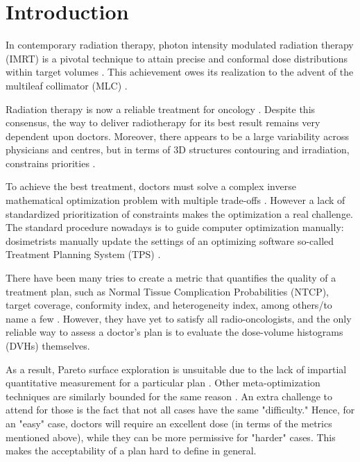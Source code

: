 \section{Introduction}
In contemporary radiation therapy, photon intensity modulated radiation therapy (IMRT) is a pivotal technique to attain precise and conformal dose distributions within target volumes \cite{xu_comparison_2017}.
This achievement owes its realization to the advent of the multileaf collimator (MLC) \cite{galvin_characterization_1993}.

Radiation therapy is now a reliable treatment for oncology \cite{valentini_survival_2009}.
Despite this consensus, the way to deliver radiotherapy for its best result remains very dependent upon doctors.
Moreover, there appears to be a large variability across physicians and centres, but in terms of 3D structures contouring and irradiation, constrains priorities \cite{variability_2021}.

To achieve the best treatment, doctors must solve a complex inverse mathematical optimization problem with multiple trade-offs \cite{oelfke_inverse_2001} \cite{webb_physical_2003}.
However a lack of standardized prioritization of constraints makes the optimization a real challenge.
The standard procedure nowadays is to guide computer optimization manually: dosimetrists manually update the settings of an optimizing software so-called Treatment Planning System (TPS) \cite{planification_website}.

There have been many tries to create a metric that quantifies the quality of a treatment plan, such as Normal Tissue Complication Probabilities (NTCP), target coverage, conformity index, and heterogeneity index, among others/to name a few \cite{lyman_normal_1992} \cite{li_input_2022}\label{metrics}.
However, they have yet to satisfy all radio-oncologists, and the only reliable way to assess a doctor's plan is to evaluate the dose-volume histograms (DVHs) themselves.

As a result, Pareto surface exploration is unsuitable due to the lack of impartial quantitative measurement for a particular plan \cite{huang_pareto_2021}.
Other meta-optimization techniques are similarly bounded for the same reason \cite{wu_optimization_2001} \cite{xing_optimization_1999}.
An extra challenge to attend for those is the fact that not all cases have the same "difficulty."
Hence, for an "easy" case, doctors will require an excellent dose (in terms of the metrics mentioned above), while they can be more permissive for "harder" cases.
This makes the acceptability of a plan hard to define in general.

